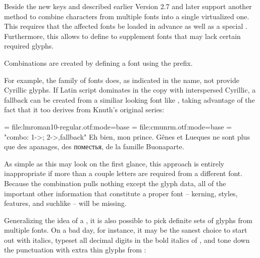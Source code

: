 \enddescriptions

\endsubsection

\endsection

Beside the new keys  and  described earlier
Version 2.7 and later support another method to combine characters from multiple fonts into a
single virtualized one. This requires that the affected fonts be loaded in
advance as well as a special . Furthermore, this
allows to define  to supplement fonts that may lack
certain required glyphs.

Combinations are created by defining a font using the  prefix.


For example, the  family of fonts does, as indicated
in the name, not provide Cyrillic glyphs. If Latin script dominates in the copy
with interspersed Cyrillic, a fallback can be created from a similiar looking
font like , taking advantage of the fact
that it too derives from Knuth’s original  series:

\beginlisting
  
  \font \lm  = file:lmroman10-regular.otf:mode=base
  \font \cmu = file:cmunrm.otf:mode=base
  \font \lmu = "combo: 1->\fontid\lm; 2->\fontid\cmu,fallback"
  \lmu Eh bien, mon prince. Gênes et Lueques ne sont plus que des
       apanages, des поместья, de la famille Buonaparte.
  \bye
\endlisting

As simple as this may look on the first glance, this approach is entirely
inappropriate if more than a couple letters are required from a different font.
Because the combination pulls nothing except the glyph data, all of the
important other information that constitute a proper font -- kerning, styles,
features, and suchlike -- will be missing.

\endsubsection %


Generalizing the idea of a , it is also possible to
pick definite sets of glyphs from multiple fonts. On a bad day, for instance,
it may be the sanest choice to start out with  italics,
typeset all decimal digits in the bold italics of ,
and tone down the punctuation with extra thin glyphs from :


